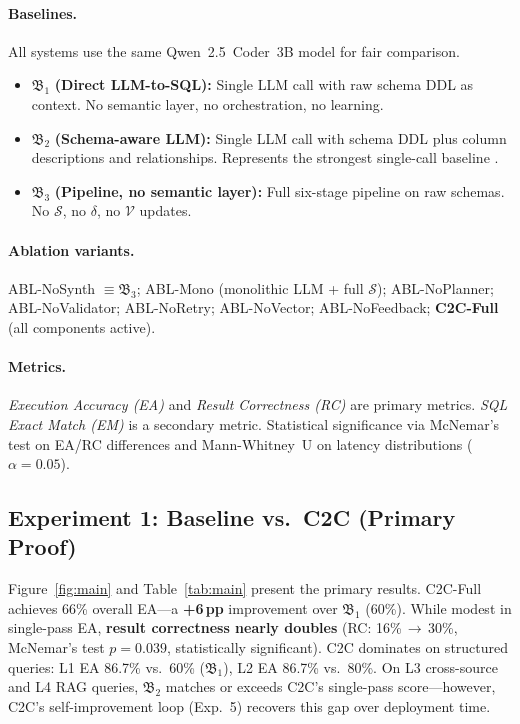 \documentclass[11pt,a4paper]{article}
\begin{document}
\paragraph{Baselines.}
All systems use the same Qwen~2.5~Coder~3B model for fair comparison.
\begin{itemize}[noitemsep,leftmargin=1.5em]
  \item $\mathfrak{B}_1$ \textbf{(Direct LLM-to-SQL):} Single LLM call with raw
    schema DDL as context.  No semantic layer, no orchestration, no learning.
  \item $\mathfrak{B}_2$ \textbf{(Schema-aware LLM):} Single LLM call with schema
    DDL plus column descriptions and relationships.  Represents the strongest
    single-call baseline \citep{shi2024survey,gao2023dail}.
  \item $\mathfrak{B}_3$ \textbf{(Pipeline, no semantic layer):} Full six-stage
    pipeline on raw schemas.  No $\mathcal{S}$, no $\delta$, no $\mathcal{V}$ updates.
\end{itemize}

\paragraph{Ablation variants.}
ABL-NoSynth $\equiv \mathfrak{B}_3$; ABL-Mono (monolithic LLM + full $\mathcal{S}$);
ABL-NoPlanner; ABL-NoValidator; ABL-NoRetry; ABL-NoVector; ABL-NoFeedback;
\textbf{C2C-Full} (all components active).

\paragraph{Metrics.}
\emph{Execution Accuracy (EA)} and \emph{Result Correctness (RC)} are primary
metrics.  \emph{SQL Exact Match (EM)} is a secondary metric.  Statistical
significance via McNemar's test on EA/RC differences and Mann-Whitney~U on latency
distributions ($\alpha = 0.05$).

\subsection{Experiment 1: Baseline vs.\ C2C (Primary Proof)}\label{sec:exp1}

Figure~\ref{fig:main} and Table~\ref{tab:main} present the primary results.
C2C-Full achieves 66\% overall EA---a \textbf{+6\,pp} improvement over
$\mathfrak{B}_1$ (60\%).  While modest in single-pass EA, \textbf{result
correctness nearly doubles} (RC: 16\%\,$\to$\,30\%, McNemar's test $p{=}0.039$,
statistically significant).  C2C dominates on structured queries: L1 EA 86.7\%
vs.\ 60\% ($\mathfrak{B}_1$), L2 EA 86.7\% vs.\ 80\%.  On L3 cross-source and L4
RAG queries, $\mathfrak{B}_2$ matches or exceeds C2C's single-pass score---however,
C2C's self-improvement loop (Exp.~5) recovers this gap over deployment time.
\end{document}
